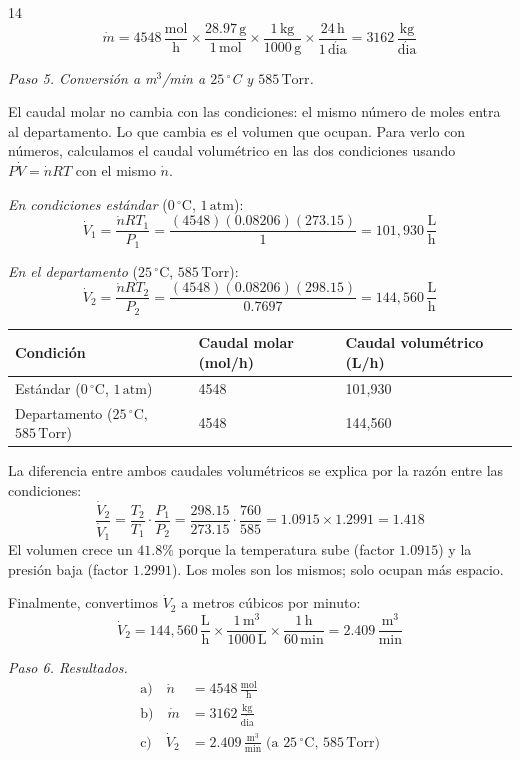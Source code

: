 \begin{exercise}{14}{}
\[
\dot{m} = 4548\,\frac{\mathrm{mol}}{\mathrm{h}}
\times \frac{28.97\,\mathrm{g}}{1\,\mathrm{mol}}
\times \frac{1\,\mathrm{kg}}{1000\,\mathrm{g}}
\times \frac{24\,\mathrm{h}}{1\,\mathrm{d\acute{i}a}}
= 3162\,\frac{\mathrm{kg}}{\mathrm{d\acute{i}a}}
\]

\textit{Paso 5. Conversión a m$^3$/min a $25\,^\circ$C y $585\,\mathrm{Torr}$.}

El caudal molar no cambia con las condiciones: el mismo número de
moles entra al departamento. Lo que cambia es el volumen que ocupan.
Para verlo con números, calculamos el caudal volumétrico en las dos
condiciones usando $P\dot{V} = \dot{n}RT$ con el mismo $\dot{n}$.

\textit{En condiciones estándar} ($0\,^\circ$C, $1\,\mathrm{atm}$):
\[
\dot{V}_1 = \frac{\dot{n}RT_1}{P_1}
= \frac{(4548)(0.08206)(273.15)}{1}
= 101{,}930\,\frac{\mathrm{L}}{\mathrm{h}}
\]

\textit{En el departamento} ($25\,^\circ$C, $585\,\mathrm{Torr}$):
\[
\dot{V}_2 = \frac{\dot{n}RT_2}{P_2}
= \frac{(4548)(0.08206)(298.15)}{0.7697}
= 144{,}560\,\frac{\mathrm{L}}{\mathrm{h}}
\]

\begin{center}
\renewcommand{\arraystretch}{1.6}
\begin{tabularx}{\textwidth}{|X|X|X|}
\hline
\textbf{Condición} & \textbf{Caudal molar (mol/h)} &
\textbf{Caudal volumétrico (L/h)} \\
\hline
Estándar ($0\,^\circ$C, $1\,\mathrm{atm}$) & 4548 & 101{,}930 \\
\hline
Departamento ($25\,^\circ$C, $585\,\mathrm{Torr}$) & 4548 & 144{,}560 \\
\hline
\end{tabularx}
\end{center}

La diferencia entre ambos caudales volumétricos se explica por la
razón entre las condiciones:
\[
\frac{\dot{V}_2}{\dot{V}_1}
= \frac{T_2}{T_1} \cdot \frac{P_1}{P_2}
= \frac{298.15}{273.15} \cdot \frac{760}{585}
= 1.0915 \times 1.2991 = 1.418
\]
El volumen crece un $41.8\%$ porque la temperatura sube (factor
$1.0915$) y la presión baja (factor $1.2991$). Los moles son los
mismos; solo ocupan más espacio.

Finalmente, convertimos $\dot{V}_2$ a metros cúbicos por minuto:
\[
\dot{V}_2 = 144{,}560\,\frac{\mathrm{L}}{\mathrm{h}}
\times \frac{1\,\mathrm{m^3}}{1000\,\mathrm{L}}
\times \frac{1\,\mathrm{h}}{60\,\mathrm{min}}
= 2.409\,\frac{\mathrm{m^3}}{\mathrm{min}}
\]

\textit{Paso 6. Resultados.}
\begin{align*}
\text{a)}\quad \dot{n} &= 4548\,\frac{\mathrm{mol}}{\mathrm{h}} \\[4pt]
\text{b)}\quad \dot{m} &= 3162\,\frac{\mathrm{kg}}{\mathrm{d\acute{i}a}} \\[4pt]
\text{c)}\quad \dot{V}_2 &= 2.409\,\frac{\mathrm{m^3}}{\mathrm{min}}
\;\text{(a $25\,^\circ$C, $585\,\mathrm{Torr}$)}
\end{align*}
\end{exercise}

